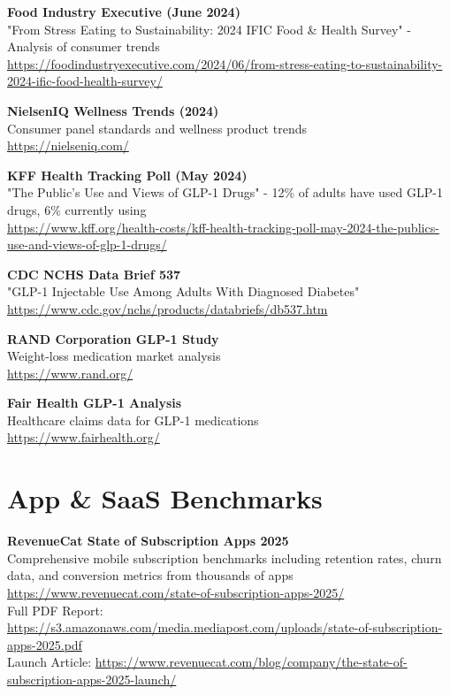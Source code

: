 \documentclass[11pt,a4paper]{report}
\begin{document}
\textbf{Food Industry Executive (June 2024)}\\
"From Stress Eating to Sustainability: 2024 IFIC Food \& Health Survey" - Analysis of consumer trends\\
\url{https://foodindustryexecutive.com/2024/06/from-stress-eating-to-sustainability-2024-ific-food-health-survey/}

\textbf{NielsenIQ Wellness Trends (2024)}\\
Consumer panel standards and wellness product trends\\
\url{https://nielseniq.com/}

\textbf{KFF Health Tracking Poll (May 2024)}\\
"The Public's Use and Views of GLP-1 Drugs" - 12\% of adults have used GLP-1 drugs, 6\% currently using\\
\url{https://www.kff.org/health-costs/kff-health-tracking-poll-may-2024-the-publics-use-and-views-of-glp-1-drugs/}

\textbf{CDC NCHS Data Brief 537}\\
"GLP-1 Injectable Use Among Adults With Diagnosed Diabetes"\\
\url{https://www.cdc.gov/nchs/products/databriefs/db537.htm}

\textbf{RAND Corporation GLP-1 Study}\\
Weight-loss medication market analysis\\
\url{https://www.rand.org/}

\textbf{Fair Health GLP-1 Analysis}\\
Healthcare claims data for GLP-1 medications\\
\url{https://www.fairhealth.org/}

\section*{App \& SaaS Benchmarks}

\textbf{RevenueCat State of Subscription Apps 2025}\\
Comprehensive mobile subscription benchmarks including retention rates, churn data, and conversion metrics from thousands of apps\\
\url{https://www.revenuecat.com/state-of-subscription-apps-2025/}\\
Full PDF Report: \url{https://s3.amazonaws.com/media.mediapost.com/uploads/state-of-subscription-apps-2025.pdf}\\
Launch Article: \url{https://www.revenuecat.com/blog/company/the-state-of-subscription-apps-2025-launch/}
\end{document}
